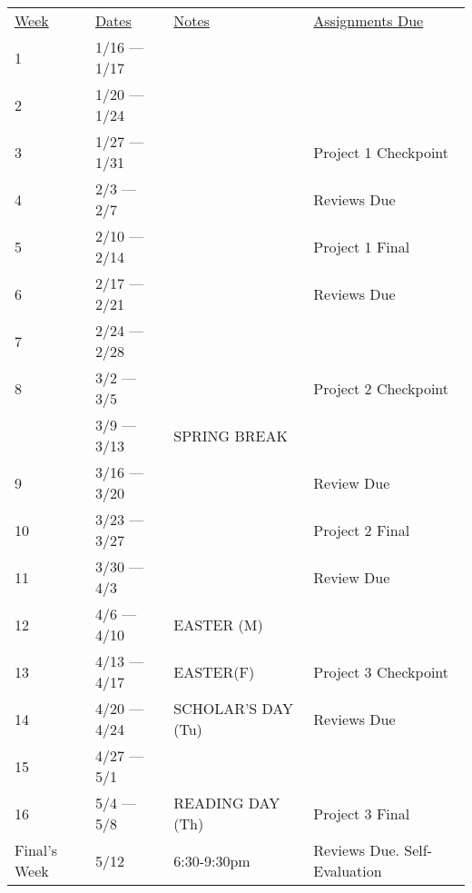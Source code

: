 \documentclass[10pt]{article}
\begin{document}
\begin{center}
\begin{tabular}{llll}
\underline{Week} & \underline{Dates} & \underline{Notes} & \underline{Assignments Due} \\
1 & 1/16 --- 1/17 &  & \\
2 & 1/20 --- 1/24 &  & \\
3 & 1/27 --- 1/31 &  & Project 1 Checkpoint\\
4 & 2/3 --- 2/7 & &  Reviews Due\\
5 & 2/10 --- 2/14 & &  Project 1 Final  \\
6 & 2/17 --- 2/21 & &   Reviews Due \\
7 & 2/24 --- 2/28 & &  \\
8 & 3/2 --- 3/5 & &  Project 2 Checkpoint   \\
& 3/9 --- 3/13 &  SPRING BREAK & \\
9 & 3/16 --- 3/20 &  & Review Due \\
10 & 3/23 --- 3/27 &   & Project 2 Final \\
11 & 3/30 --- 4/3 & & Review Due\\
12 & 4/6 --- 4/10 & EASTER (M)  &  \\
13 & 4/13 --- 4/17 & EASTER(F) & Project 3 Checkpoint \\
14 & 4/20 --- 4/24 & SCHOLAR'S DAY (Tu) & Reviews Due  \\
15 & 4/27 --- 5/1 &  &  \\
16 & 5/4 --- 5/8 & READING DAY (Th)  & Project 3 Final \\
Final's Week & 5/12 & 6:30-9:30pm & Reviews Due. Self-Evaluation \\
\end{tabular}
\end{center}
\end{document}
